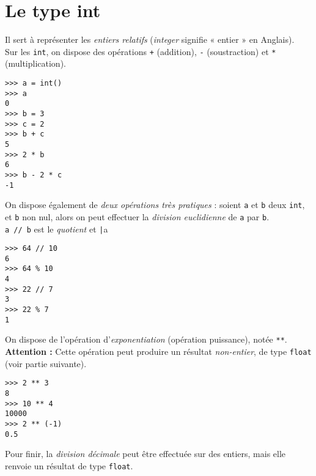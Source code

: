 \section{Le type int}\label{sec:int}

Il sert à représenter les \textit{entiers relatifs} (\textit{integer} signifie « entier »  en Anglais).\\
Sur les \texttt{int}, on dispose des opérations \texttt{+} (addition), \texttt{-} (soustraction) et \texttt{*} (multiplication).

\begin{pys}\begin{verbatim}
>>> a = int()
>>> a
0
>>> b = 3
>>> c = 2
>>> b + c
5
>>> 2 * b
6
>>> b - 2 * c
-1
\end{verbatim}
\end{pys}

On dispose également de \textit{deux opérations très pratiques} : soient \texttt{a} et \texttt{b} deux \texttt{int}, et \texttt{b} non nul, alors on peut effectuer
la \textit{division euclidienne} de \texttt{a} par \texttt{b}.\\
\texttt{a // b} est le \textit{quotient} et \texttt|a %

\begin{pys}\begin{verbatim}
>>> 64 // 10
6
>>> 64 % 10
4
>>> 22 // 7
3
>>> 22 % 7
1
\end{verbatim}
\end{pys}



On dispose de l'opération d'\textit{exponentiation} (opération puissance), notée \texttt{**}.\\
\textbf{Attention :} Cette opération peut produire un résultat \textit{non-entier}, de type \texttt{float} (voir partie suivante).

\begin{pys}\begin{verbatim}
>>> 2 ** 3
8
>>> 10 ** 4
10000
>>> 2 ** (-1)
0.5
\end{verbatim}
\end{pys}

Pour finir, la \textit{division décimale} peut être effectuée sur des entiers, mais elle renvoie un résultat de type \texttt{float}.

